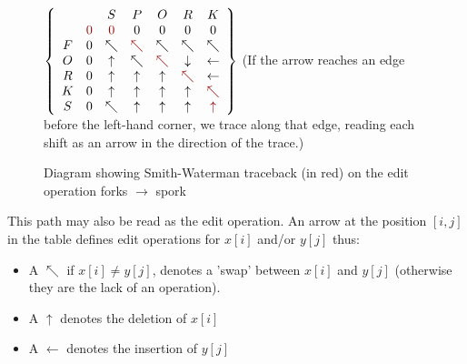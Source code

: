 \documentclass[a4paper,11pt,twoside,notitlepage]{article}
\begin{document}
        \begin{figure}[h!]
          \centering
          $\left\{
                \begin{array}{ccccccc}
                    &   & S & P & O & R & K \\
                    & \color{red}{0} & \color{red}{0} & 0 & 0 & 0 & 0 \\
                  F & 0 & \nwarrow & \color{red}{\nwarrow} & \nwarrow & \nwarrow & \nwarrow \\
                  O & 0 & \uparrow & \nwarrow & \color{red}{\nwarrow} & \downarrow & \leftarrow \\
                  R & 0 & \uparrow & \uparrow & \uparrow & \color{red}{\nwarrow} & \leftarrow \\
                  K & 0 & \uparrow & \uparrow & \uparrow & \uparrow & \color{red}{\nwarrow} \\
                  S & 0 & \nwarrow & \uparrow & \uparrow & \uparrow & \color{red}{\uparrow} \\
                \end{array}\right\} $
                (If the arrow reaches an edge before the left-hand
                corner, we trace along that edge, reading each shift
                as an arrow in the direction of the trace.)
                \caption{Diagram showing Smith-Waterman traceback (in
                  red) on the edit operation forks $\rightarrow$
                  spork}
          \label{fig:smith-waterman-traceback}
        \end{figure}

        This path may also be read as the edit operation. An arrow at
        the position $[i,j]$ in the table defines edit operations for
        $x[i]$ and/or $y[j]$ thus:\\
        \begin{itemize}
          \item A $\nwarrow$ if
        $x[i] \neq y[j]$, denotes a 'swap' between $x[i]$ and $y[j]$
        (otherwise they are the lack of an operation).
          \item A $\uparrow$ denotes the deletion of $x[i]$
          \item A $\leftarrow$ denotes the insertion of $y[j]$
        \end{itemize}
\end{document}
